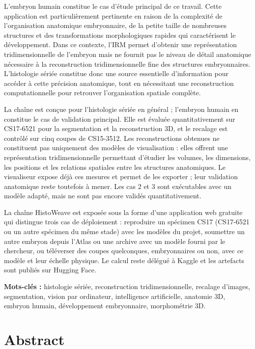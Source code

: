 \documentclass[12pt,a4paper]{report}
\begin{document}
L'embryon humain constitue le cas d'étude principal de ce travail. Cette application est particulièrement pertinente en raison de la complexité de l'organisation anatomique embryonnaire, de la petite taille de nombreuses structures et des transformations morphologiques rapides qui caractérisent le développement. Dans ce contexte, l'IRM permet d'obtenir une représentation tridimensionnelle de l'embryon mais ne fournit pas le niveau de détail anatomique nécessaire à la reconstruction tridimensionnelle fine des structures embryonnaires. L'histologie sériée constitue donc une source essentielle d'information pour accéder à cette précision anatomique, tout en nécessitant une reconstruction computationnelle pour retrouver l'organisation spatiale complète.

La chaîne est conçue pour l'histologie sériée en général ; l'embryon humain en constitue le cas de validation principal. Elle est évaluée quantitativement sur CS17-6521 pour la segmentation et la reconstruction 3D, et le recalage est contrôlé sur cinq coupes de CS15-3512. Les reconstructions obtenues ne constituent pas uniquement des modèles de visualisation : elles offrent une représentation tridimensionnelle permettant d'étudier les volumes, les dimensions, les positions et les relations spatiales entre les structures anatomiques. Le visualiseur expose déjà ces mesures et permet de les exporter ; leur validation anatomique reste toutefois à mener. Les cas 2 et 3 sont exécutables avec un modèle adapté, mais ne sont pas encore validés quantitativement.

La chaîne HistoWeave est exposée sous la forme d'une application web gratuite qui distingue trois cas de déploiement : reproduire un spécimen CS17 (CS17-6521 ou un autre spécimen du même stade) avec les modèles du projet, soumettre un autre embryon depuis l'Atlas ou une archive avec un modèle fourni par le chercheur, ou téléverser des coupes quelconques, embryonnaires ou non, avec ce modèle et leur échelle physique. Le calcul reste délégué à Kaggle et les artefacts sont publiés sur Hugging Face.

\textbf{Mots-clés :} histologie sériée, reconstruction tridimensionnelle, recalage d'images, segmentation, vision par ordinateur, intelligence artificielle, anatomie 3D, embryon humain, développement embryonnaire, morphométrie 3D.

\chapter*{Abstract}
\end{document}
